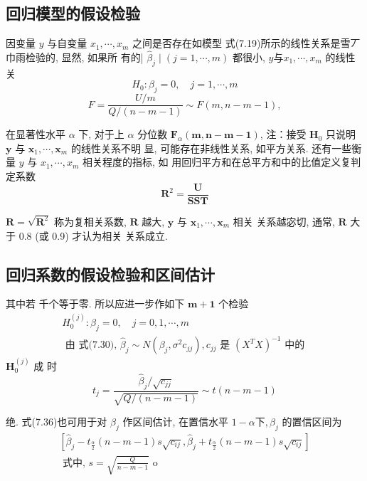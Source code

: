 \subsection{回归模型的假设检验}

因变量 \( y \) 与自变量 \( x_{1}, \cdots, x_{m} \) 之间是否存在如模型 式(7.19)所示的线性关系是雪丆巾雨检验的, 显然, 如果所 有的| \( \hat{\beta}_{j} \mid(j=1, \cdots, m) \) 都很小, \( y 与 x_{1}, \cdots, x_{m} \) 的线性关
$$
H_{0}: \beta_{j}=0, \quad j=1, \cdots, m
$$
$$
F=\frac{U / m}{Q /(n-m-1)} \sim F(m, n-m-1),
$$

在显著性水平 \( \alpha \) 下, 对于上 \( \alpha \) 分位数 \( \boldsymbol{F}_{\alpha}(\boldsymbol{m}, \boldsymbol{n}-\boldsymbol{m}-\mathbf{1}) \),
注：接受 \( \boldsymbol{H}_{0} \) 只说明 \( \boldsymbol{y} \) 与 \( \boldsymbol{x}_{1}, \cdots, \boldsymbol{x}_{m} \) 的线性关系不明
显, 可能存在非线性关系, 如平方关系.  还有一些衡量 \( y \) 与 \( x_{1}, \cdots, x_{m} \) 相关程度的指标, 如 用回归平方和在总平方和中的比值定义复判定系数
$$
\boldsymbol{R}^{2}=\frac{\boldsymbol{U}}{\boldsymbol{S S T}}
$$

\( \boldsymbol{R}=\sqrt{\boldsymbol{R}^{2}} \) 称为复相关系数, \( \boldsymbol{R} \) 越大, \( \boldsymbol{y} \) 与 \( \boldsymbol{x}_{1}, \cdots, \boldsymbol{x}_{m} \) 相关
关系越宓切, 通常,  \( \boldsymbol{R} \) 大于 \( 0.8 \) (或 0.9) 才认为相关
关系成立. 

\subsection{回归系数的假设检验和区间估计}

其中若 千个等于零. 所以应进一步作如下 \( \boldsymbol{m}+\mathbf{1} \) 个检验
$$
\begin{array}{l}
H_{0}^{(j)}: \beta_{j}=0, \quad j=0,1, \cdots, m \\
\text { 由 式(7.30), } \hat{\beta}_{j} \sim N\left(\beta_{j}, \sigma^{2} c_{j j}\right), c_{j j} \text { 是 }\left(X^{T} X\right)^{-1} \text { 中的 }
\end{array}
$$
\( \boldsymbol{H}_{0}^{(j)} \) 成 时
$$
t_{j}=\frac{\hat{\beta}_{j} / \sqrt{c_{j j}}}{\sqrt{Q /(n-m-1)}} \sim t(n-m-1)
$$

绝.  式(7.36)也可用于对 \( \beta_{j} \) 作区间估计, 在置信水平 \( 1-\alpha 下, \beta_{j} \) 的置信区间为
$$
\begin{array}{l}
{\left[\hat{\beta}_{j}-t_{\frac{\alpha}{2}}(n-m-1) s \sqrt{c_{i j}}, \hat{\beta}_{j}+t_{\frac{\alpha}{2}}(n-m-1) s \sqrt{c_{i j}}\right]} \\
\text { 式中, } s=\sqrt{\frac{Q}{n-m-1}} \text { o }
\end{array}
$$

